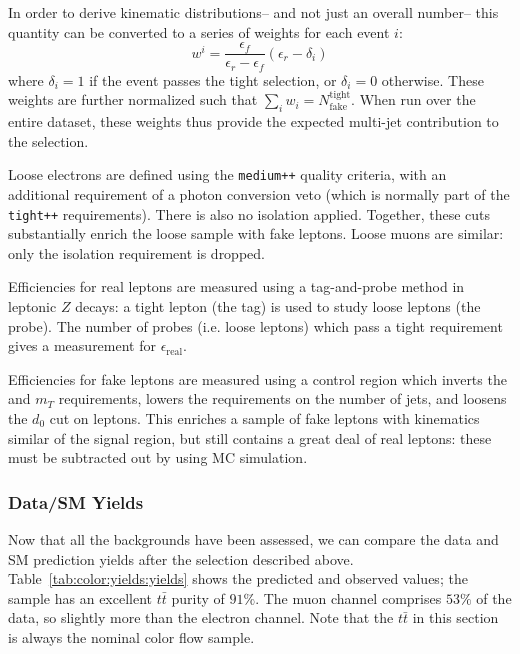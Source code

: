 In order to derive kinematic distributions-- and not just an overall number-- this quantity can be converted to a series of weights for each event $i$:
%
\begin{equation}
w^i = \frac{\epsilon_f}{\epsilon_r - \epsilon_f} (\epsilon_r - \delta_i)
\end{equation}
%
where $\delta_i = 1$ if the event passes the tight selection, or $\delta_i = 0$ otherwise. These weights are further normalized such that $\sum_i w_i = N_\mathrm{fake}^\mathrm{tight}$. When run over the entire dataset, these weights thus provide the expected multi-jet contribution to the selection.

Loose electrons are defined using the \texttt{medium++} quality criteria, with an additional requirement of a photon conversion veto (which is normally part  of the \texttt{tight++} requirements). There is also no isolation applied. Together, these cuts substantially enrich the loose sample with fake leptons. Loose muons are similar: only the isolation requirement is dropped.  

Efficiencies for real leptons are measured using a tag-and-probe method in leptonic $Z$ decays: a tight lepton (the tag) is used to study loose leptons (the probe). The number of probes (i.e. loose leptons) which pass a tight requirement gives a measurement for $\epsilon_\mathrm{real}$. 

Efficiencies for fake leptons are measured using a control region which inverts the \met and $m_T$ requirements, lowers the requirements on the number of jets, and loosens the $d_0$ cut on leptons. This enriches a sample of fake leptons with kinematics similar of the signal region, but still contains a great deal of real leptons: these must be subtracted out by using MC simulation.

\subsubsection{Data/SM Yields}

Now that all the backgrounds have been assessed, we can compare the data and SM prediction yields after the selection described above. Table~\ref{tab:color:yields:yields} shows the predicted and observed values; the sample has an excellent $t\bar{t}$ purity of $91\%$. The muon channel comprises $53\%$ of the data, so slightly more than the electron channel. Note that the $t\bar{t}$ in this section is always the nominal color flow \PowPythia sample.


